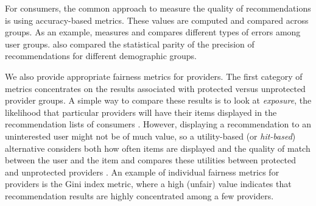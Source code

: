 

For consumers, the common approach to measure the quality of recommendations is using accuracy-based metrics. These values are computed and compared across groups. As an example, \cite{yao2017beyond} measures and compares different types of errors among user groups. \cite{burke2018balanced} also compared the statistical parity of the precision of recommendations for different demographic groups. 


We also provide appropriate fairness metrics for providers. The first category of metrics concentrates on the results associated with protected versus unprotected provider groups. A simple way to compare these results is to look at \textit{exposure}, the likelihood that particular providers will have their items displayed in the recommendation lists of consumers \cite{liu2019farpfar,sonboli2020opportunistic}. However, displaying a recommendation to an uninterested user might not be of much value, so a utility-based (or \textit{hit-based}) alternative considers both how often items are displayed and the quality of match between the user and the item and compares these utilities between protected and unprotected providers \cite{singh2018fairness,biega2018equity}. An example of individual fairness metrics for providers is the Gini index metric, where a high (unfair) value indicates that recommendation results are highly concentrated among a few providers.

